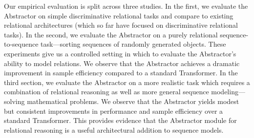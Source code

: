 Our empirical evaluation is split across three studies. In the first, we evaluate the Abstractor on simple discriminative relational tasks and compare to existing relational architectures (which so far have focused on discriminative relational tasks). In the second, we evaluate the Abstractor on a purely relational sequence-to-sequence task---sorting sequences of randomly generated objects. These experiments give us a controlled setting in which to evaluate the Abstractor's ability to model relations. We observe that the Abstractor achieves a dramatic improvement in sample efficiency compared to a standard Transformer. In the third section, we evaluate the Abstractor on a more realistic task which requires a combination of relational reasoning as well as more general sequence modeling---solving mathematical problems. We observe that the Abstractor yields modest but consistent improvements in performance and sample efficiency over a standard Transformer. This provides evidence that the Abstractor module for relational reasoning is a useful architectural addition to sequence models.

